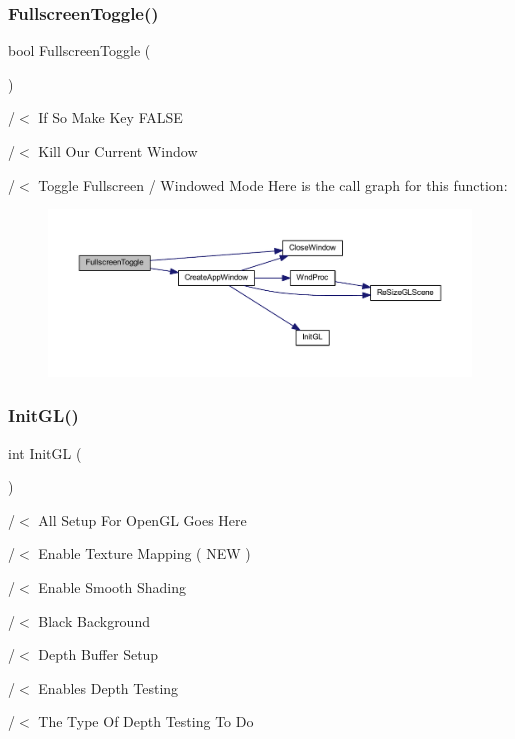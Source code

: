\subsubsection{Fullscreen\+Toggle()}
{\footnotesize\ttfamily bool Fullscreen\+Toggle (\begin{DoxyParamCaption}{ }\end{DoxyParamCaption})}

/$<$ If So Make Key F\+A\+L\+SE

/$<$ Kill Our Current Window

/$<$ Toggle Fullscreen / Windowed Mode Here is the call graph for this function\+:\nopagebreak
\begin{figure}[H]
\begin{center}
\leavevmode
\includegraphics[width=350pt]{supportcode_8cpp_a79e747d7a0c4b5bad264e5a27c00baa5_cgraph}
\end{center}
\end{figure}
\mbox{\label{supportcode_8cpp_aa4c387d3f1ebce6d57684b6a10c9b0ae}} 
\subsubsection{Init\+G\+L()}
{\footnotesize\ttfamily int Init\+GL (\begin{DoxyParamCaption}\item[{G\+Lvoid}]{ }\end{DoxyParamCaption})}



/$<$ All Setup For Open\+GL Goes Here 

/$<$ Enable Texture Mapping ( N\+EW )

/$<$ Enable Smooth Shading

/$<$ Black Background

/$<$ Depth Buffer Setup

/$<$ Enables Depth Testing

/$<$ The Type Of Depth Testing To Do

